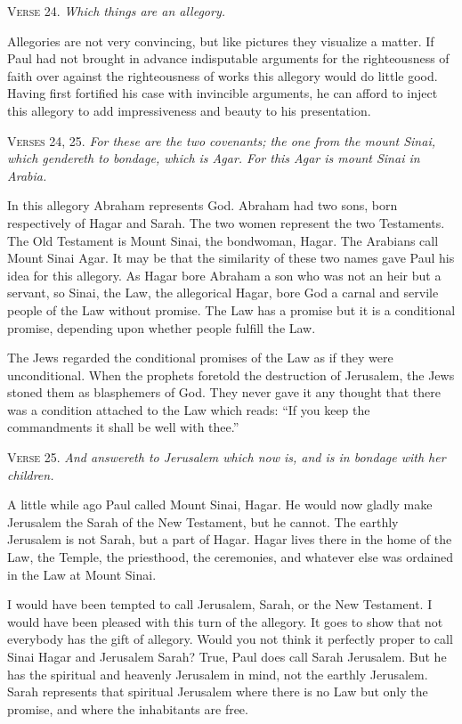 \textsc{Verse} 24. \emph{Which things are an allegory.}

Allegories are not very convincing, but like pictures they visualize a matter. If Paul had not brought in advance indisputable arguments for the righteousness of faith over against the righteousness of works this allegory would do little good. Having first fortified his case with invincible arguments, he can afford to inject this allegory to add impressiveness and beauty to his presentation.

\textsc{Verses} 24, 25. \emph{For these are the two covenants; the one from the mount Sinai, which gendereth to bondage, which is Agar. For this Agar is mount Sinai in Arabia.}

In this allegory Abraham represents God. Abraham had two sons, born respectively of Hagar and Sarah. The two women represent the two Testaments. The Old Testament is Mount Sinai, the bondwoman, Hagar. The Arabians call Mount Sinai Agar. It may be that the similarity of these two names gave Paul his idea for this allegory. As Hagar bore Abraham a son who was not an heir but a servant, so Sinai, the Law, the allegorical Hagar, bore God a carnal and servile people of the Law without promise. The Law has a promise but it is a conditional promise, depending upon whether people fulfill the Law.

The Jews regarded the conditional promises of the Law as if they were unconditional. When the prophets foretold the destruction of Jerusalem, the Jews stoned them as blasphemers of God. They never gave it any thought that there was a condition attached to the Law which reads: “If you keep the commandments it shall be well with thee.”

\textsc{Verse} 25. \emph{And answereth to Jerusalem which now is, and is in bondage with her children.}

A little while ago Paul called Mount Sinai, Hagar. He would now gladly make Jerusalem the Sarah of the New Testament, but he cannot. The earthly Jerusalem is not Sarah, but a part of Hagar. Hagar lives there in the home of the Law, the Temple, the priesthood, the ceremonies, and whatever else was ordained in the Law at Mount Sinai.

I would have been tempted to call Jerusalem, Sarah, or the New Testament. I would have been pleased with this turn of the allegory. It goes to show that not everybody has the gift of allegory. Would you not think it perfectly proper to call Sinai Hagar and Jerusalem Sarah? True, Paul does call Sarah Jerusalem. But he has the spiritual and heavenly Jerusalem in mind, not the earthly Jerusalem. Sarah represents that spiritual Jerusalem where there is no Law but only the promise, and where the inhabitants are free.

